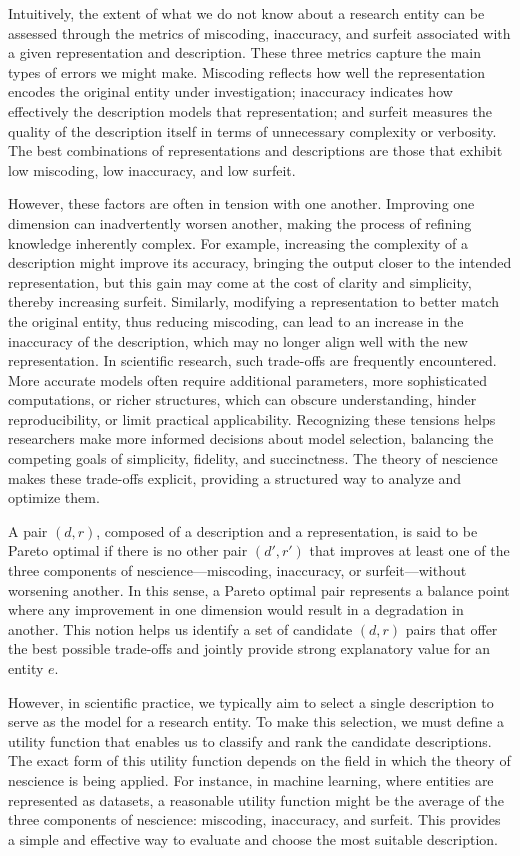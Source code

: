 Intuitively, the extent of what we do not know about a research entity can be assessed through the metrics of miscoding, inaccuracy, and surfeit associated with a given representation and description. These three metrics capture the main types of errors we might make. Miscoding reflects how well the representation encodes the original entity under investigation; inaccuracy indicates how effectively the description models that representation; and surfeit measures the quality of the description itself in terms of unnecessary complexity or verbosity. The best combinations of representations and descriptions are those that exhibit low miscoding, low inaccuracy, and low surfeit.

However, these factors are often in tension with one another. Improving one dimension can inadvertently worsen another, making the process of refining knowledge inherently complex. For example, increasing the complexity of a description might improve its accuracy, bringing the output closer to the intended representation, but this gain may come at the cost of clarity and simplicity, thereby increasing surfeit. Similarly, modifying a representation to better match the original entity, thus reducing miscoding, can lead to an increase in the inaccuracy of the description, which may no longer align well with the new representation. In scientific research, such trade-offs are frequently encountered. More accurate models often require additional parameters, more sophisticated computations, or richer structures, which can obscure understanding, hinder reproducibility, or limit practical applicability. Recognizing these tensions helps researchers make more informed decisions about model selection, balancing the competing goals of simplicity, fidelity, and succinctness. The theory of nescience makes these trade-offs explicit, providing a structured way to analyze and optimize them.

A pair $(d, r)$, composed of a description and a representation, is said to be Pareto optimal if there is no other pair $(d', r')$ that improves at least one of the three components of nescience—miscoding, inaccuracy, or surfeit—without worsening another. In this sense, a Pareto optimal pair represents a balance point where any improvement in one dimension would result in a degradation in another. This notion helps us identify a set of candidate $(d, r)$ pairs that offer the best possible trade-offs and jointly provide strong explanatory value for an entity $e$.

However, in scientific practice, we typically aim to select a single description to serve as the model for a research entity. To make this selection, we must define a utility function that enables us to classify and rank the candidate descriptions. The exact form of this utility function depends on the field in which the theory of nescience is being applied. For instance, in machine learning, where entities are represented as datasets, a reasonable utility function might be the average of the three components of nescience: miscoding, inaccuracy, and surfeit. This provides a simple and effective way to evaluate and choose the most suitable description.

